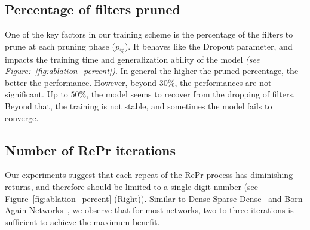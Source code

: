 \subsection{Percentage of filters pruned }
One of the key factors in our training scheme is the percentage of the filters to prune at each pruning phase ($p_\%$). It behaves like the Dropout parameter, and impacts the training time and generalization ability of the model \textit{(see Figure:~\ref{fig:ablation_percent})}. 
In general the higher the pruned percentage, the better the performance. However, beyond $30\%$, the performances are not significant.
Up to $50\%$, the model seems to recover from the dropping of filters. 
Beyond that, the training is not stable, and sometimes the model fails to converge.

\subsection{Number of RePr iterations }
Our experiments suggest that each repeat of the RePr process has diminishing returns, and therefore should be limited to a single-digit number (see Figure~\ref{fig:ablation_percent} (Right)).
Similar to Dense-Sparse-Dense~\cite{Han2016DSDDT} and Born-Again-Networks~\cite{Furlanello2018BornAN}, we observe that for most networks, two to three iterations is sufficient to achieve the maximum benefit.

